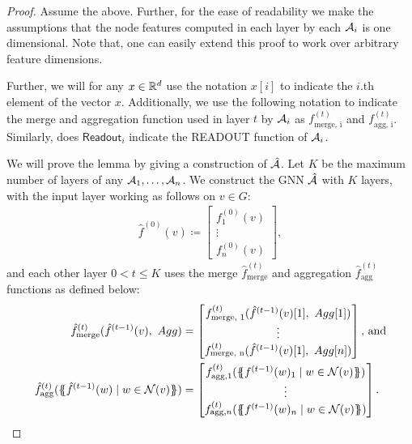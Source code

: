 \begin{proof}
    Assume the above. Further, for the ease of readability we make the assumptions that the node features computed in each layer by each $\mathcal{A}_i$ is one dimensional. Note that, one can easily extend this proof to work over arbitrary feature dimensions.

    Further, we will for any $x \in \mathbb{R}^d$ use the notation $x[i]$ to indicate the $i$.th element of the vector $x$. Additionally, we use the following notation to indicate the merge and aggregation function used in layer $t$ by $\mathcal{A}_i$ as $f^{(t)}_{\text{merge, i}}$ and $f^{(t)}_{\text{agg, i}}$. Similarly, does $\textsf{Readout}_i$ indicate the \textsf{READOUT} function of $\mathcal{A}_i$.
    
    We will prove the lemma by giving a construction of $\hat{\mathcal{A}}$. Let $K$ be the maximum number of layers of any $\mathcal{A}_1, \dots, \mathcal{A}_n$. We construct the GNN $\hat{\mathcal{A}}$ with $K$ layers, with the input layer working as follows on $v \in G$:
    \begin{align*}
        \hat{f}^{(0)}(v) \coloneqq \begin{bmatrix}
            f^{(0)}_1(v)\\
            \vdots\\
            f^{(0)}_n(v)
        \end{bmatrix},
    \end{align*}
    and each other layer $0 < t \leq K$ uses the merge $\hat{f}^{(t)}_{\text{merge}}$ and aggregation $\hat{f}^{(t)}_{\text{agg}}$ functions as defined below:
    \begin{align*}
        \hat{f}^{(t)}_{\text{merge}} (\hat{f}^{(t-1)}(v), \ Agg) &= \begin{bmatrix}
            f^{(t)}_{\text{merge, 1}}(\hat{f}^{(t-1)}(v)[1],\ Agg[1])\\
            \vdots\\
            f^{(t)}_{\text{merge, n}}(\hat{f}^{(t-1)}(v)[1],\ Agg[n])
        \end{bmatrix}\text{, and}\\
        \hat{f}^{(t)}_{\text{agg}}(\MSopen \hat{f}^{(t-1)}(w) \mid w \in \mathcal{N}(v) \MSclose ) &= \begin{bmatrix}
            f^{(t)}_{\text{agg}, 1}(\MSopen f^{(t-1)}(w)_1 \mid w \in \mathcal{N}(v) \MSclose)\\
            \vdots\\
            f^{(t)}_{\text{agg}, n}(\MSopen f^{(t-1)}(w)_n \mid w \in \mathcal{N}(v) \MSclose)
        \end{bmatrix}.

\end{align*}
\end{proof}
